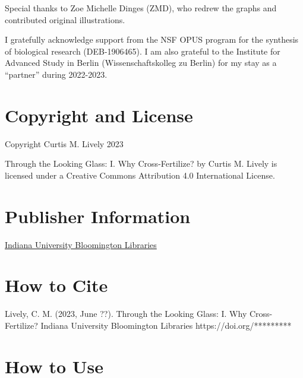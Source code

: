 \documentclass[
  letterpaper,
]{book}
\begin{document}
Special thanks to Zoe Michelle Dinges (ZMD), who redrew the graphs and
contributed original illustrations.

I gratefully acknowledge support from the NSF OPUS program for the
synthesis of biological research (DEB-1906465). I am also grateful to
the Institute for Advanced Study in Berlin (Wissenschaftskolleg zu
Berlin) for my stay as a ``partner'' during 2022-2023.

\hypertarget{copyright-and-license}{%
\section*{Copyright and License}\label{copyright-and-license}}


Copyright Curtis M. Lively 2023

{Through the Looking Glass: I. Why Cross-Fertilize?} by Curtis M. Lively
is licensed under a Creative Commons Attribution 4.0 International
License.

\hypertarget{publisher-information}{%
\section*{Publisher Information}\label{publisher-information}}


\href{https://libraries.indiana.edu/}{Indiana University Bloomington
Libraries}

\hypertarget{how-to-cite}{%
\section*{How to Cite}\label{how-to-cite}}


Lively, C. M. (2023, June ??). Through the Looking Glass: I. Why
Cross-Fertilize? Indiana University Bloomington Libraries
https://doi.org/*********

\hypertarget{how-to-use}{%
\section*{How to Use}\label{how-to-use}}

\end{document}
